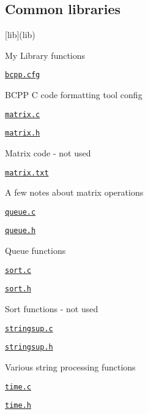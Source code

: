 \subsection*{Common libraries}


\begin{DoxyItemize}
\item \mbox{[}lib\mbox{]}(lib)
\begin{DoxyItemize}
\item My Library functions
\item \href{lib/bcpp.cfg}{\tt bcpp.\+cfg}
\begin{DoxyItemize}
\item B\+C\+PP C code formatting tool config
\end{DoxyItemize}
\item \href{lib/matrix.c}{\tt matrix.\+c}
\item \href{lib/matrix.h}{\tt matrix.\+h}
\begin{DoxyItemize}
\item Matrix code -\/ not used
\end{DoxyItemize}
\item \href{lib/matrix.txt}{\tt matrix.\+txt}
\begin{DoxyItemize}
\item A few notes about matrix operations
\end{DoxyItemize}
\item \href{lib/queue.c}{\tt queue.\+c}
\item \href{lib/queue.h}{\tt queue.\+h}
\begin{DoxyItemize}
\item Queue functions
\end{DoxyItemize}
\item \href{lib/sort.c}{\tt sort.\+c}
\item \href{lib/sort.h}{\tt sort.\+h}
\begin{DoxyItemize}
\item Sort functions -\/ not used
\end{DoxyItemize}
\item \href{lib/stringsup.c}{\tt stringsup.\+c}
\item \href{lib/stringsup.h}{\tt stringsup.\+h}
\begin{DoxyItemize}
\item Various string processing functions
\end{DoxyItemize}
\item \href{lib/time.c}{\tt time.\+c}
\item \href{lib/time.h}{\tt time.\+h}

\end{DoxyItemize}
\end{DoxyItemize}
